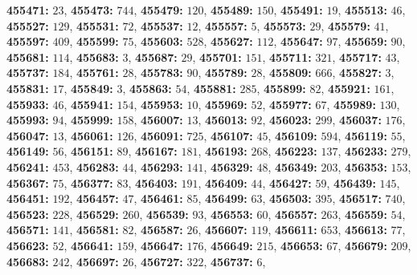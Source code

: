 \textsf{\bfseries 455471:} $23$, \textsf{\bfseries 455473:} $744$, \textsf{\bfseries 455479:} $120$, \textsf{\bfseries 455489:} $150$, \textsf{\bfseries 455491:} $19$, \textsf{\bfseries 455513:} $46$, \textsf{\bfseries 455527:} $129$, \textsf{\bfseries 455531:} $72$, \textsf{\bfseries 455537:} $12$, \textsf{\bfseries 455557:} $5$, \textsf{\bfseries 455573:} $29$, \textsf{\bfseries 455579:} $41$, \textsf{\bfseries 455597:} $409$, \textsf{\bfseries 455599:} $75$, \textsf{\bfseries 455603:} $528$, \textsf{\bfseries 455627:} $112$, \textsf{\bfseries 455647:} $97$, \textsf{\bfseries 455659:} $90$, \textsf{\bfseries 455681:} $114$, \textsf{\bfseries 455683:} $3$, \textsf{\bfseries 455687:} $29$, \textsf{\bfseries 455701:} $151$, \textsf{\bfseries 455711:} $321$, \textsf{\bfseries 455717:} $43$, \textsf{\bfseries 455737:} $184$, \textsf{\bfseries 455761:} $28$, \textsf{\bfseries 455783:} $90$, \textsf{\bfseries 455789:} $28$, \textsf{\bfseries 455809:} $666$, \textsf{\bfseries 455827:} $3$, \textsf{\bfseries 455831:} $17$, \textsf{\bfseries 455849:} $3$, \textsf{\bfseries 455863:} $54$, \textsf{\bfseries 455881:} $285$, \textsf{\bfseries 455899:} $82$, \textsf{\bfseries 455921:} $161$, \textsf{\bfseries 455933:} $46$, \textsf{\bfseries 455941:} $154$, \textsf{\bfseries 455953:} $10$, \textsf{\bfseries 455969:} $52$, \textsf{\bfseries 455977:} $67$, \textsf{\bfseries 455989:} $130$, \textsf{\bfseries 455993:} $94$, \textsf{\bfseries 455999:} $158$, \textsf{\bfseries 456007:} $13$, \textsf{\bfseries 456013:} $92$, \textsf{\bfseries 456023:} $299$, \textsf{\bfseries 456037:} $176$, \textsf{\bfseries 456047:} $13$, \textsf{\bfseries 456061:} $126$, \textsf{\bfseries 456091:} $725$, \textsf{\bfseries 456107:} $45$, \textsf{\bfseries 456109:} $594$, \textsf{\bfseries 456119:} $55$, \textsf{\bfseries 456149:} $56$, \textsf{\bfseries 456151:} $89$, \textsf{\bfseries 456167:} $181$, \textsf{\bfseries 456193:} $268$, \textsf{\bfseries 456223:} $137$, \textsf{\bfseries 456233:} $279$, \textsf{\bfseries 456241:} $453$, \textsf{\bfseries 456283:} $44$, \textsf{\bfseries 456293:} $141$, \textsf{\bfseries 456329:} $48$, \textsf{\bfseries 456349:} $203$, \textsf{\bfseries 456353:} $153$, \textsf{\bfseries 456367:} $75$, \textsf{\bfseries 456377:} $83$, \textsf{\bfseries 456403:} $191$, \textsf{\bfseries 456409:} $44$, \textsf{\bfseries 456427:} $59$, \textsf{\bfseries 456439:} $145$, \textsf{\bfseries 456451:} $192$, \textsf{\bfseries 456457:} $47$, \textsf{\bfseries 456461:} $85$, \textsf{\bfseries 456499:} $63$, \textsf{\bfseries 456503:} $395$, \textsf{\bfseries 456517:} $740$, \textsf{\bfseries 456523:} $228$, \textsf{\bfseries 456529:} $260$, \textsf{\bfseries 456539:} $93$, \textsf{\bfseries 456553:} $60$, \textsf{\bfseries 456557:} $263$, \textsf{\bfseries 456559:} $54$, \textsf{\bfseries 456571:} $141$, \textsf{\bfseries 456581:} $82$, \textsf{\bfseries 456587:} $26$, \textsf{\bfseries 456607:} $119$, \textsf{\bfseries 456611:} $653$, \textsf{\bfseries 456613:} $77$, \textsf{\bfseries 456623:} $52$, \textsf{\bfseries 456641:} $159$, \textsf{\bfseries 456647:} $176$, \textsf{\bfseries 456649:} $215$, \textsf{\bfseries 456653:} $67$, \textsf{\bfseries 456679:} $209$, \textsf{\bfseries 456683:} $242$, \textsf{\bfseries 456697:} $26$, \textsf{\bfseries 456727:} $322$, \textsf{\bfseries 456737:} $6$, 
